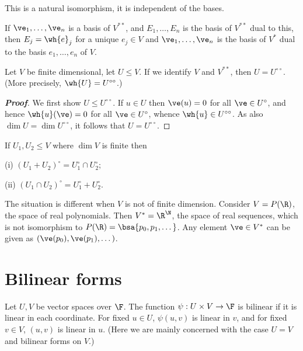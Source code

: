 \begin{remark}
This is a natural isomorphism, it is independent of the bases.
\end{remark}

\begin{remark}
If $\ve_1, \dots, \ve_n$ is a basis of $V^{**}$, and $E_1, \dots,E_n$ is the basis of $V^{**}$ dual to this, then $E_j = \wh{e}_j$ for a unique $e_j \in V$ and $\ve_1, \dots, \ve_n$ is the basis of $V^*$ dual to the basis $e_1, \dots, e_n$ of $V$.
\end{remark}

\begin{lemma}
Let $V$ be finite dimensional, let $U \leq  V$. If we identify $V$ and $V^{**}$, then $U = U^{\circ\circ}$. (More precisely, $\wh{U} = U^{\circ\circ}$.)
\end{lemma}

\begin{proof}[\bf Proof]
We first show $U \leq U^{\circ\circ}$. If $u \in U$ then $\ve(u) = 0$ for all $\ve \in U^\circ$, and hence $\wh{u}(\ve) = 0$ for all $\ve \in U^\circ$, whence $\wh{u} \in U^{\circ\circ}$. As also $\dim U = \dim U^{\circ\circ}$, it follows that $U = U^{\circ\circ}$.
\end{proof}

\begin{lemma}
If $U_1,U_2 \leq V$ where $\dim V$ is finite then
\ben
\item [(i)] $(U_1 + U_2)^\circ = U^\circ_1 \cap U^\circ_2$;
\item [(ii)] $(U_1 \cap U_2)^\circ = U^\circ_1 + U^\circ_2$.
\een
\end{lemma}

\begin{remark}
The situation is different when $V$ is not of finite dimension. Consider $V = P(\R)$, the space of real polynomials. Then $V^* = \R^\N$, the space of real sequences, which is not isomorphism to $P(\R) = \bsa{p_0, p_1, \dots}$. Any element $\ve \in V^*$ can be given as $(\ve(p_0), \ve(p_1), \dots)$.
\end{remark}


\section{Bilinear forms}

\begin{definition}
Let $U, V$ be vector spaces over $\F$. The function $\psi: U \times  V \to \F$ is bilinear if it is linear in each coordinate. For fixed $u \in U$, $\psi(u, v)$ is linear in $v$, and for fixed $v \in V$, $(u, v)$ is linear in $u$. (Here we are mainly concerned with the case $U = V$ and bilinear forms on $V$.)
\end{definition}

